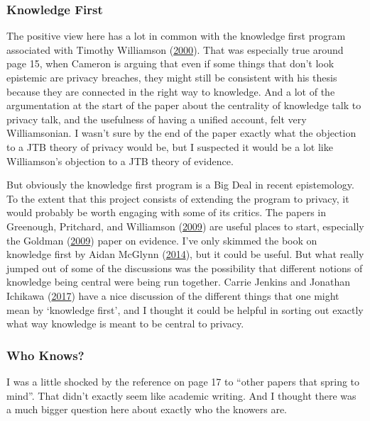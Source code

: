\documentclass[
  letterpaper,
  DIV=11,
  numbers=noendperiod]{scrartcl}
\begin{document}
\hypertarget{knowledge-first}{%
\subsubsection{Knowledge First}\label{knowledge-first}}

The positive view here has a lot in common with the knowledge first
program associated with Timothy Williamson
(\protect\hyperlink{ref-Williamson2000}{2000}). That was especially true
around page 15, when Cameron is arguing that even if some things that
don't look epistemic are privacy breaches, they might still be
consistent with his thesis because they are connected in the right way
to knowledge. And a lot of the argumentation at the start of the paper
about the centrality of knowledge talk to privacy talk, and the
usefulness of having a unified account, felt very Williamsonian. I
wasn't sure by the end of the paper exactly what the objection to a JTB
theory of privacy would be, but I suspected it would be a lot like
Williamson's objection to a JTB theory of evidence.

But obviously the knowledge first program is a Big Deal in recent
epistemology. To the extent that this project consists of extending the
program to privacy, it would probably be worth engaging with some of its
critics. The papers in Greenough, Pritchard, and Williamson
(\protect\hyperlink{ref-Greenough2009-GREWOK}{2009}) are useful places
to start, especially the Goldman
(\protect\hyperlink{ref-Goldman2009}{2009}) paper on evidence. I've only
skimmed the book on knowledge first by Aidan McGlynn
(\protect\hyperlink{ref-McGlynn2014-MCGKF}{2014}), but it could be
useful. But what really jumped out of some of the discussions was the
possibility that different notions of knowledge being central were being
run together. Carrie Jenkins and Jonathan Ichikawa
(\protect\hyperlink{ref-Ichikawa2017-ICHOPK}{2017}) have a nice
discussion of the different things that one might mean by `knowledge
first', and I thought it could be helpful in sorting out exactly what
way knowledge is meant to be central to privacy.

\hypertarget{who-knows}{%
\subsubsection{Who Knows?}\label{who-knows}}

I was a little shocked by the reference on page 17 to ``other papers
that spring to mind''. That didn't exactly seem like academic writing.
And I thought there was a much bigger question here about exactly who
the knowers are.
\end{document}
